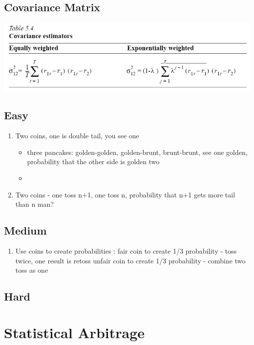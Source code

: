 \documentclass[11pt, openany]{book}              %
\begin{document}
\section{Covariance Matrix}

\includegraphics[scale=0.5]{Cov.JPG}

\section{Easy}
\begin{enumerate}
 \item Two coins, one is double tail, you see one \\
  \begin{itemize}
    \item three pancakes: golden-golden, golden-brunt, brunt-brunt, see one golden, probability that the other side is golden two
    \item 
   \end{itemize}
 \item Two coins - one toss n+1, one toss n, probability that n+1 gets more tail than n man?
\end{enumerate}


\section{Medium}
\begin{enumerate}
	\item Use coins to create probabilities : fair coin to create 1/3 probability - toss twice, one result is retoss
unfair coin to create 1/3 probability - combine two toss as one


 \end{enumerate}
 
\section{Hard}
\chapter{Statistical Arbitrage}
\end{document}
